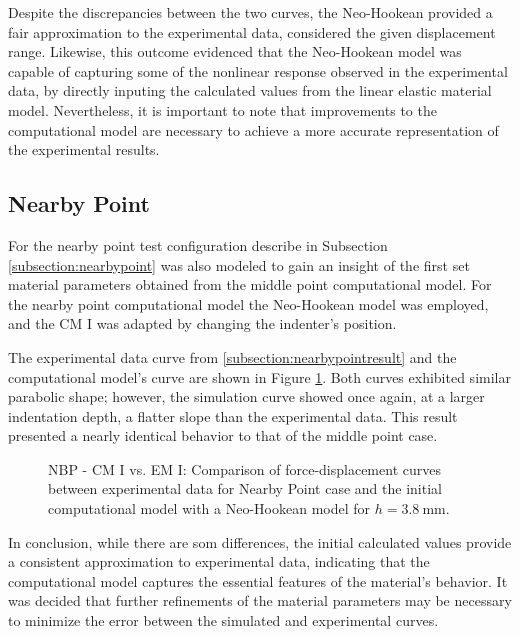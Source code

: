 Despite the discrepancies between the two curves, the Neo-Hookean provided a fair approximation to the experimental data, considered the 
given displacement range. Likewise, this outcome evidenced that the Neo-Hookean model was capable of capturing some of the nonlinear 
response observed in the experimental data, by directly inputing the calculated values from the linear elastic material model.
Nevertheless, it is important to note that improvements to the computational model are necessary to achieve a more
accurate representation of the experimental results.

\subsection{Nearby Point}
For the nearby point test configuration describe in Subsection \ref{subsection:nearbypoint} was also modeled to gain an insight 
of the first set material parameters obtained from the middle point computational model.
For the nearby point computational model the Neo-Hookean model was employed, and the CM I was adapted by changing the 
indenter's position.

The experimental data curve from \ref{subsection:nearbypointresult} and the computational model's curve are shown in Figure 
\ref{fig:nbpointIvsCPINBNH}. Both curves exhibited similar parabolic shape; however, the simulation curve showed once again,
at a larger indentation depth, a flatter slope than the experimental data. This result presented a 
nearly identical behavior to that of the middle point case.\\
\label{subsection:nbpcpI}
\begin{figure}%
    \centering
   \quad
   \caption[Nearby Point: CM I vs. Experimental data - Neo-Hookean]{NBP - CM I vs. EM I: Comparison of force-displacement curves between experimental data for Nearby Point case and the initial computational model with a Neo-Hookean model for $h = \SI{3.8}{\milli \meter}$.}%
   \label{fig:nbpointIvsCPINBNH}%
\end{figure}
In conclusion, while there are som differences, the initial calculated values provide a consistent approximation to experimental
data, indicating that the computational model captures the essential features of the material's behavior.
It was decided that further refinements of the material parameters may be necessary to minimize the error between the 
simulated and experimental curves.

